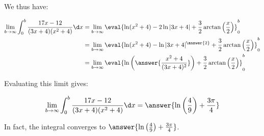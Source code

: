 \documentclass{ximera}
\begin{document}
\begin{exercise}
\begin{exercise}
\begin{exercise}
\begin{exercise}
We thus have:

\begin{align*}
\lim_{b\rightarrow \infty} \int_{0}^{b} \frac{17x-12}{(3x+4)(x^2+4)} \d x &= \lim_{b\rightarrow \infty} \eval{ \ln(x^2+4)-2 \ln|3x+4|+\frac{3}{2} \arctan\left(\frac{x}{2}\right)}_0^b  \\
&= \lim_{b\rightarrow \infty} \eval{ \ln(x^2+4)- \ln|3x+4|^{\answer{2}}+\frac{3}{2} \arctan\left(\frac{x}{2}\right)}_0^b \\
&= \lim_{b\rightarrow \infty} \eval{ \ln\left(\answer{\frac{x^2+4}{(3x+4)^2}}\right)+\frac{3}{2} \arctan\left(\frac{x}{2}\right)}_0^b
\end{align*}

\begin{exercise}
Evaluating this limit gives:

\[ \lim_{b\rightarrow \infty} \int_{0}^{b} \frac{17x-12}{(3x+4)(x^2+4)} \d x  = \answer{\ln\left(\frac{4}{9}\right) + \frac{3 \pi}{4}  }
\]

\begin{multipleChoice}
\end{multipleChoice}

\begin{exercise}
In fact, the integral converges to $\answer{\ln\left(\frac{4}{9}\right) + \frac{3 \pi}{4}  }$.
\end{exercise}
\end{exercise}
\end{exercise}
\end{exercise}
\end{exercise}








\end{exercise}
\end{document}
